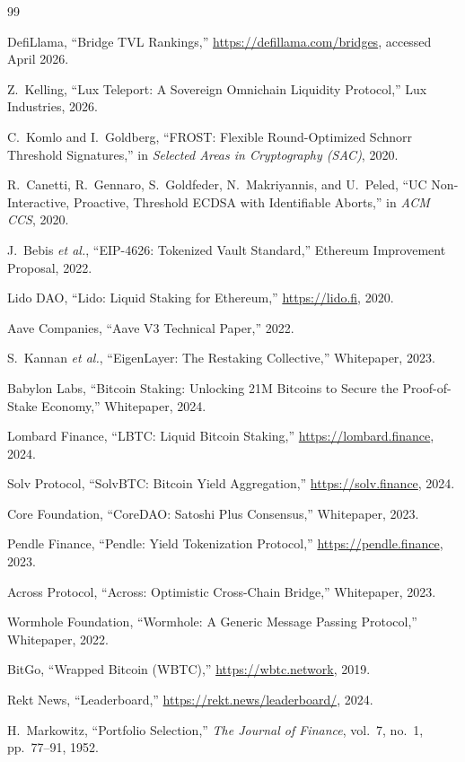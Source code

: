 \documentclass[11pt,twocolumn]{article}
\begin{document}
\begin{thebibliography}{99}

 DefiLlama, ``Bridge TVL Rankings,'' \url{https://defillama.com/bridges}, accessed April 2026.

 Z.~Kelling, ``Lux Teleport: A Sovereign Omnichain Liquidity Protocol,'' Lux Industries, 2026.

 C.~Komlo and I.~Goldberg, ``FROST: Flexible Round-Optimized Schnorr Threshold Signatures,'' in \emph{Selected Areas in Cryptography (SAC)}, 2020.

 R.~Canetti, R.~Gennaro, S.~Goldfeder, N.~Makriyannis, and U.~Peled, ``UC Non-Interactive, Proactive, Threshold ECDSA with Identifiable Aborts,'' in \emph{ACM CCS}, 2020.

 J.~Bebis \emph{et al.}, ``EIP-4626: Tokenized Vault Standard,'' Ethereum Improvement Proposal, 2022.

 Lido DAO, ``Lido: Liquid Staking for Ethereum,'' \url{https://lido.fi}, 2020.

 Aave Companies, ``Aave V3 Technical Paper,'' 2022.

 S.~Kannan \emph{et al.}, ``EigenLayer: The Restaking Collective,'' Whitepaper, 2023.

 Babylon Labs, ``Bitcoin Staking: Unlocking 21M Bitcoins to Secure the Proof-of-Stake Economy,'' Whitepaper, 2024.

 Lombard Finance, ``LBTC: Liquid Bitcoin Staking,'' \url{https://lombard.finance}, 2024.

 Solv Protocol, ``SolvBTC: Bitcoin Yield Aggregation,'' \url{https://solv.finance}, 2024.

 Core Foundation, ``CoreDAO: Satoshi Plus Consensus,'' Whitepaper, 2023.

 Pendle Finance, ``Pendle: Yield Tokenization Protocol,'' \url{https://pendle.finance}, 2023.

 Across Protocol, ``Across: Optimistic Cross-Chain Bridge,'' Whitepaper, 2023.

 Wormhole Foundation, ``Wormhole: A Generic Message Passing Protocol,'' Whitepaper, 2022.

 BitGo, ``Wrapped Bitcoin (WBTC),'' \url{https://wbtc.network}, 2019.

 Rekt News, ``Leaderboard,'' \url{https://rekt.news/leaderboard/}, 2024.

 H.~Markowitz, ``Portfolio Selection,'' \emph{The Journal of Finance}, vol.~7, no.~1, pp.~77--91, 1952.

\end{thebibliography}
\end{document}
